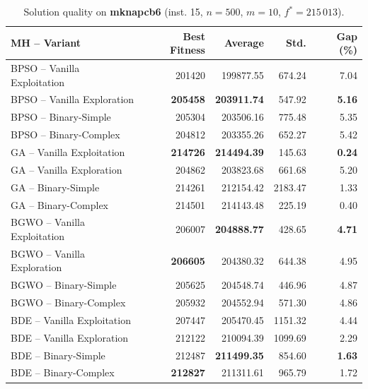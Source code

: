 \begin{table}[htbp]
  \centering
  \small
  \caption{Solution quality on \textbf{mknapcb6} (inst. 15, $n=500$, $m=10$, $f^*=215\,013$).}
  \label{tab:calidad_mknapcb6_15}
  \begin{tabular}{lrrrr}
    \toprule
    \textbf{MH -- Variant} &
    \textbf{Best Fitness} &
    \textbf{Average} &
    \textbf{Std.} &
    \textbf{Gap (\%)} \\
    \midrule
    BPSO -- Vanilla Exploitation &         201420 &        199877.55 & 674.24 &         7.04 \\
    BPSO -- Vanilla Exploration  & \textbf{205458} & \textbf{203911.74} & 547.92 & \textbf{5.16} \\
    BPSO -- Binary-Simple        &         205304 &        203506.16 & 775.48 &         5.35 \\
    BPSO -- Binary-Complex       &         204812 &        203355.26 & 652.27 &         5.42 \\
    \midrule
    GA -- Vanilla Exploitation   & \textbf{214726} & \textbf{214494.39} & 145.63 & \textbf{0.24} \\
    GA -- Vanilla Exploration    &         204862 &        203823.68 & 661.68 &         5.20 \\
    GA -- Binary-Simple          &         214261 &        212154.42 & 2183.47 &         1.33 \\
    GA -- Binary-Complex         &         214501 &        214143.48 & 225.19 &         0.40 \\
    \midrule
    BGWO -- Vanilla Exploitation &         206007 & \textbf{204888.77} & 428.65 & \textbf{4.71} \\
    BGWO -- Vanilla Exploration  & \textbf{206605} &        204380.32 & 644.38 &         4.95 \\
    BGWO -- Binary-Simple        &         205625 &        204548.74 & 446.96 &         4.87 \\
    BGWO -- Binary-Complex       &         205932 &        204552.94 & 571.30 &         4.86 \\
    \midrule
    BDE -- Vanilla Exploitation  &         207447 &        205470.45 & 1151.32 &         4.44 \\
    BDE -- Vanilla Exploration   &         212122 &        210094.39 & 1099.69 &         2.29 \\
    BDE -- Binary-Simple         &         212487 & \textbf{211499.35} & 854.60 & \textbf{1.63} \\
    BDE -- Binary-Complex        & \textbf{212827} &        211311.61 & 965.79 &         1.72 \\
    \bottomrule
  \end{tabular}
\end{table}
